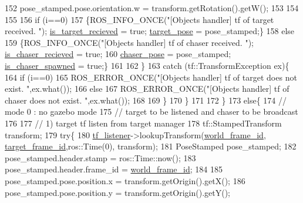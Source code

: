 \begin{DoxyCode}
152                 pose\_stamped.pose.orientation.w = transform.getRotation().getW();
153 
154 
155 
156                 \textcolor{keywordflow}{if} (i==0)
157                     \{ROS\_INFO\_ONCE(\textcolor{stringliteral}{"[Objects handler] tf of target received. "}); 
      \hyperlink{class_objects_handler_a7691f3e1ec58e55ead30c50c555f169a}{is\_target\_recieved} = \textcolor{keyword}{true}; \hyperlink{class_objects_handler_ad436bfd8b262f473f0e4ca92b3c3402b}{target\_pose} = pose\_stamped;\} 
158                 \textcolor{keywordflow}{else}
159                     \{ROS\_INFO\_ONCE(\textcolor{stringliteral}{"[Objects handler] tf of chaser received. "}); 
      \hyperlink{class_objects_handler_a86f8528ff5697c87fc6a3fcd6ba0f42c}{is\_chaser\_recieved} = \textcolor{keyword}{true};
160                              \hyperlink{class_objects_handler_a79fd5f872a40cca5ea599f1e83dcb3ad}{chaser\_pose} = pose\_stamped; 
      \hyperlink{class_objects_handler_a16165ae7c0167ba8d2a0151a8a4fbfd5}{is\_chaser\_spawned} = \textcolor{keyword}{true};\}  
161 
162             \}
163             \textcolor{keywordflow}{catch} (tf::TransformException ex)\{
164                 \textcolor{keywordflow}{if} (i==0)
165                     ROS\_ERROR\_ONCE(\textcolor{stringliteral}{"[Objects handler] tf of target does not exist. "},ex.what());  
166                 \textcolor{keywordflow}{else}
167                     ROS\_ERROR\_ONCE(\textcolor{stringliteral}{"[Objects handler] tf of chaser does not exist. "},ex.what());  
168             
169             \}
170         \}
171 
172     \}
173     \textcolor{keywordflow}{else}\{
174         \textcolor{comment}{// mode 0 : no gazebo mode  }
175         \textcolor{comment}{// target to be listened and chaser to be broadcast  }
176 
177         \textcolor{comment}{// 1) target tf listen from target manager  }
178         tf::StampedTransform transform;    
179         \textcolor{keywordflow}{try}\{
180             \hyperlink{class_objects_handler_aea45bba31aa769008386100725bda66b}{tf\_listener}->lookupTransform(\hyperlink{class_objects_handler_a1c0586ae7467bb8a3df8ad247ac7b10b}{world\_frame\_id},
      \hyperlink{class_objects_handler_a7a616768386c4c7da9af4da3d07bd936}{target\_frame\_id},ros::Time(0), transform);
181             PoseStamped pose\_stamped;
182             pose\_stamped.header.stamp = ros::Time::now();
183             pose\_stamped.header.frame\_id = \hyperlink{class_objects_handler_a1c0586ae7467bb8a3df8ad247ac7b10b}{world\_frame\_id};
184 
185             pose\_stamped.pose.position.x = transform.getOrigin().getX();
186             pose\_stamped.pose.position.y = transform.getOrigin().getY();

\end{DoxyCode}
